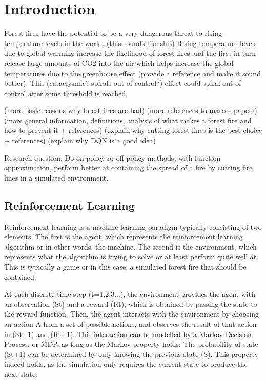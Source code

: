 \section{Introduction}\label{sec:introduction}
Forest fires have the potential to be a very dangerous threat to rising temperature levels in the world. (this sounds like shit) Rising temperature levels due to global warming increase the likelihood of forest fires and the fires in turn release large amounts of CO2 into the air which helps increase the global temperatures due to the greenhouse effect (provide a reference and make it sound better). This (cataclysmic? spirals out of control?) effect could spiral out of control after some threshold is reached.

(more basic reasons why forest fires are bad)
(more references to marcos papers)
(more general information, definitions, analysis of what makes a forest fire and how to prevent it + references)
(explain why cutting forest lines is the best choice + references)
(explain why DQN is a good idea)

Research question: Do on-policy or off-policy methods, with function approximation, perform better at containing the spread of a fire by cutting fire lines in a simulated environment.

\subsection{Reinforcement Learning}\label{sec:reinforcementlearning}
Reinforcement learning is a machine learning paradigm typically consisting of two elements. The first is the agent, which represents the reinforcement learning algorithm or in other words, the machine. The second is the environment, which represents what the algorithm is trying to solve or at least perform quite well at. This is typically a game or in this case, a simulated forest fire that should be contained.

At each discrete time step (t=1,2,3...), the environment provides the agent with an observation (St) and a reward (Rt), which is obtained by passing the state to the reward function. Then, the agent interacts with the environment by choosing an action A from a set of possible actions, and observes the result of that action in (St+1) and (Rt+1). This interaction can be modelled by a Markov Decision Process, or MDP, as long as the Markov property holds: The probability of state (St+1) can be determined by only knowing the previous state (S). This property indeed holds, as the simulation only requires the current state to produce the next state.

